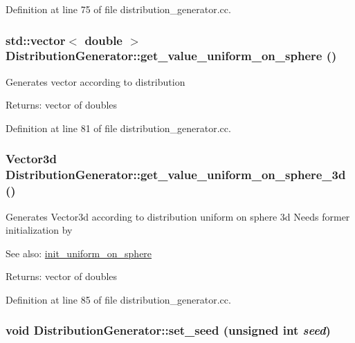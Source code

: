 Definition at line 75 of file distribution\_\-generator.cc.\hypertarget{class_distribution_generator_e11f8754b4a01555fcf929ac58179021}{
\subsubsection[get\_\-value\_\-uniform\_\-on\_\-sphere]{\setlength{\rightskip}{0pt plus 5cm}std::vector$<$ double $>$ DistributionGenerator::get\_\-value\_\-uniform\_\-on\_\-sphere ()}}
\label{class_distribution_generator_e11f8754b4a01555fcf929ac58179021}


Generates vector according to distribution \begin{Desc}
\item[Returns:]vector of doubles \end{Desc}


Definition at line 81 of file distribution\_\-generator.cc.\hypertarget{class_distribution_generator_8162739d29e15e6a7ffacd2e66954ae6}{
\subsubsection[get\_\-value\_\-uniform\_\-on\_\-sphere\_\-3d]{\setlength{\rightskip}{0pt plus 5cm}Vector3d DistributionGenerator::get\_\-value\_\-uniform\_\-on\_\-sphere\_\-3d ()}}
\label{class_distribution_generator_8162739d29e15e6a7ffacd2e66954ae6}


Generates Vector3d according to distribution uniform on sphere 3d Needs former initialization by \begin{Desc}
\item[See also:]\hyperlink{class_distribution_generator_66a05089faa08bf8939496f87c2672ef}{init\_\-uniform\_\-on\_\-sphere} \end{Desc}
\begin{Desc}
\item[Returns:]vector of doubles \end{Desc}


Definition at line 85 of file distribution\_\-generator.cc.\hypertarget{class_distribution_generator_0d1d61ff597511560c3e48a5ee7ccee9}{
\subsubsection[set\_\-seed]{\setlength{\rightskip}{0pt plus 5cm}void DistributionGenerator::set\_\-seed (unsigned int {\em seed})}}
\label{class_distribution_generator_0d1d61ff597511560c3e48a5ee7ccee9}


